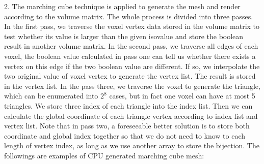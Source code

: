 \documentclass[acmtog]{acmart}
\begin{document}
2. The marching cube technique is applied to generate the mesh and render according to the volume matrix. 
The whole process is divided into three passes. 
In the first pass, we traverse the voxel vertex data stored in the volume matrix 
to test whether its value is larger than the given isovalue and store the boolean result in another volume matrix. 
In the second pass, we traverse all edges of each voxel, the boolean value calculated in pass one can tell us 
whether there exists a vertex on this edge if the two boolean value are different. 
If so, we interpolate the two original value of voxel vertex to generate the vertex list. 
The result is stored in the vertex list. In the pass three, we traverse the voxel to generate the triangle, 
which can be enumerated into $2^8$ cases, but in fact one voxel can have at most 5 triangles. 
We store three index of each triangle into the index list. Then we can calculate the global coordinate 
of each triangle vertex according to index list and vertex list. 
Note that in pass two, a foreseeable better solution is to store both coordinate and global index together 
so that we do not need to know to each length of vertex index, as long as we use another array to store the bijection.
The followings are examples of CPU generated marching cube mesh:
\end{document}
